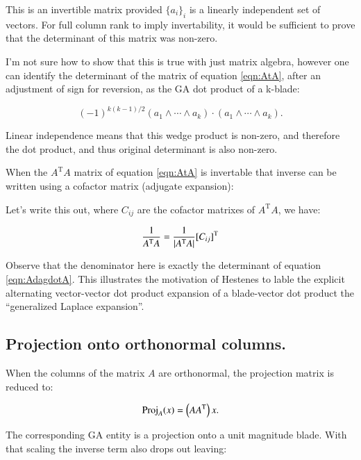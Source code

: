 \documentclass{article}      %
\newcommand{\T}[0]{\text{T}}
\newcommand{\Det}[1] {\abs{#1}}
\begin{document}
This is an invertible matrix provided $\{a_i\}_i$ is a linearly independent set of vectors.
For full column rank to imply invertability, it would be sufficient to prove that the 
determinant of this matrix was non-zero.

I'm not sure how to show that this is true with just matrix algebra, however
one can identify the determinant of the matrix of equation \ref{eqn:AtA}, after an adjustment
of sign for reversion, as the GA dot product of a k-blade:

\begin{equation}\label{eqn:AdagdotA}
(-1)^{k(k-1)/2} (a_1 \wedge \cdots \wedge a_k) \cdot (a_1 \wedge \cdots \wedge a_k).
\end{equation}

Linear independence means that this wedge product is non-zero, and therefore the dot product, and thus original determinant is also non-zero.

When the $A^\T A$ matrix of equation \ref{eqn:AtA} is invertable that inverse can be written using a cofactor matrix (adjugate expansion):

Let's write this out, where $C_{ij}$ are the cofactor matrixes of $A^\T A$, we have:

\[
\inv{A^\T A} = \inv{ \Det{ A^\T A } } {[ C_{ij} ]}^\T
\]

Observe that the denominator here is exactly the determinant of equation \ref{eqn:AdagdotA}.  This illustrates
the motivation of Hestenes to lable the explicit alternating vector-vector dot product expansion of a 
blade-vector dot product the ``generalized Laplace expansion''.


\subsection{ Projection onto orthonormal columns. }

When the 
columns of the matrix $A$ are orthonormal, the projection matrix is reduced to:

\[
\Proj_A(x) = \left( A A^\T \right) x.
\]

The corresponding GA entity is a projection onto a unit magnitude blade.  With that scaling the inverse term also drops out leaving:
\end{document}
